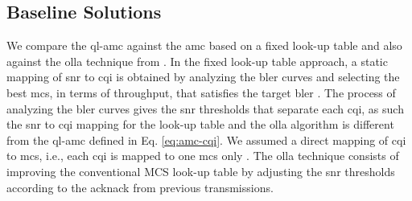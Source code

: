 \subsection{Baseline Solutions}

%
We compare the \gls{ql-amc} against the \gls{amc} based on a fixed look-up table \cite{fantacci2009adaptive} and also against the \gls{olla} technique from \cite{Pedersen2007}.
%
In the fixed look-up table approach, a static mapping of \gls{snr} to \gls{cqi} is obtained by analyzing the \gls{bler} curves and selecting the best \gls{mcs}, in terms of throughput, that satisfies the target \gls{bler} \cite{bruno2014robust}.
%
The process of analyzing the \gls{bler} curves gives the \gls{snr} thresholds that separate each \gls{cqi}, as such the \gls{snr} to \gls{cqi} mapping for the look-up table and the \gls{olla} algorithm is different from the \gls{ql-amc} defined in Eq. \eqref{eq:amc-cqi}.
%
We assumed a direct mapping of \gls{cqi} to \gls{mcs}, i.e., each \gls{cqi} is mapped to one \gls{mcs} only .
The \gls{olla} technique consists of improving the conventional MCS look-up table by adjusting the \gls{snr} thresholds according to the \gls{acknack} from previous transmissions.
